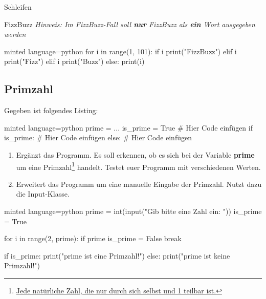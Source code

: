 \begin{task}[points=auto]{Schleifen}
\begin{subtask*}[points=0]{FizzBuzz }
        \textit{Hinweis: Im FizzBuzz-Fall soll \textbf{nur} FizzBuzz als \textbf{ein} Wort ausgegeben werden}

        \begin{solution}
            \begin{codeBlock}[]{minted language=python}
                for i in range(1, 101):
                if i %
                    print("FizzBuzz")
                elif i %
                    print("Fizz")
                elif i %
                    print("Buzz")
                else:
                    print(i)
        \end{codeBlock}
        \end{solution}
    \end{subtask*}
    \begin{subtask*}[points=0]{}
        \subsection{Primzahl }
        Gegeben ist folgendes Listing:
        \begin{codeBlock}[]{minted language=python}
            prime = ...
            is_prime = True
            # Hier Code einfügen
            if is_prime:
                # Hier Code einfügen
            else:
                # Hier Code einfügen
        \end{codeBlock}
        \begin{enumerate}
            \item Ergänzt das Programm. Es soll erkennen, ob es sich bei der Variable \textbf{prime} um eine Primzahl\footnote{\href{https://de.wikipedia.org/wiki/Primzahl}{Jede natürliche Zahl, die nur durch sich selbst und 1 teilbar ist.}} handelt. Testet euer Programm mit verschiedenen Werten.
            \item Erweitert das Programm um eine manuelle Eingabe der Primzahl. Nutzt dazu die Input-Klasse.
        \end{enumerate}

        \begin{solution}
            \begin{codeBlock}[]{minted language=python}
                prime = int(input("Gib bitte eine Zahl ein: "))
                is_prime = True

                for i in range(2, prime):
                    if prime %
                        is_prime = False
                        break

                if is_prime:
                    print("{prime} ist eine Primzahl!")
                else:
                    print("{prime} ist keine Primzahl!")
            \end{codeBlock}
        \end{solution}
    \end{subtask*}
\end{task}
